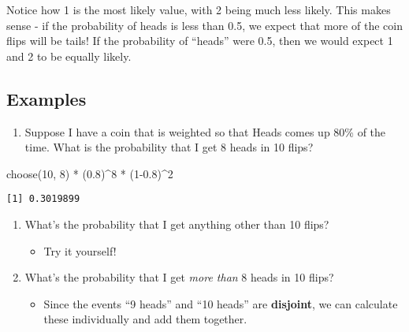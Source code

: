 \documentclass[
  letterpaper,
  DIV=11,
  numbers=noendperiod]{scrreprt}
\newenvironment{Shaded}{\begin{snugshade}}{\end{snugshade}}
\newcommand{\DecValTok}[1]{\textcolor[rgb]{0.68,0.00,0.00}{#1}}
\newcommand{\FloatTok}[1]{\textcolor[rgb]{0.68,0.00,0.00}{#1}}
\newcommand{\FunctionTok}[1]{\textcolor[rgb]{0.28,0.35,0.67}{#1}}
\newcommand{\NormalTok}[1]{\textcolor[rgb]{0.00,0.23,0.31}{#1}}
\newcommand{\SpecialCharTok}[1]{\textcolor[rgb]{0.37,0.37,0.37}{#1}}
\providecommand{\tightlist}{%
  \setlength{\itemsep}{0pt}\setlength{\parskip}{0pt}}\usepackage{longtable,booktabs,array}
\begin{document}
Notice how 1 is the most likely value, with 2 being much less likely.
This makes sense - if the probability of heads is less than 0.5, we
expect that more of the coin flips will be tails! If the probability of
``heads'' were 0.5, then we would expect 1 and 2 to be equally likely.

\hypertarget{examples-2}{%
\subsection{Examples}\label{examples-2}}

\begin{enumerate}
\def\labelenumi{\arabic{enumi}.}
\tightlist
\item
  Suppose I have a coin that is weighted so that Heads comes up 80\% of
  the time. What is the probability that I get 8 heads in 10 flips?
\end{enumerate}

\begin{Shaded}
\begin{Highlighting}[]
\FunctionTok{choose}\NormalTok{(}\DecValTok{10}\NormalTok{, }\DecValTok{8}\NormalTok{) }\SpecialCharTok{*}\NormalTok{ (}\FloatTok{0.8}\NormalTok{)}\SpecialCharTok{\^{}}\DecValTok{8} \SpecialCharTok{*}\NormalTok{ (}\DecValTok{1}\FloatTok{{-}0.8}\NormalTok{)}\SpecialCharTok{\^{}}\DecValTok{2}
\end{Highlighting}
\end{Shaded}

\begin{verbatim}
[1] 0.3019899
\end{verbatim}

\begin{enumerate}
\def\labelenumi{\arabic{enumi}.}
\setcounter{enumi}{1}
\tightlist
\item
  What's the probability that I get anything other than 10 flips?

  \begin{itemize}
  \tightlist
  \item
    Try it yourself!
  \end{itemize}
\item
  What's the probability that I get \emph{more than} 8 heads in 10
  flips?

  \begin{itemize}
  \tightlist
  \item
    Since the events ``9 heads'' and ``10 heads'' are \textbf{disjoint},
    we can calculate these individually and add them together.
  \end{itemize}
\end{enumerate}
\end{document}
